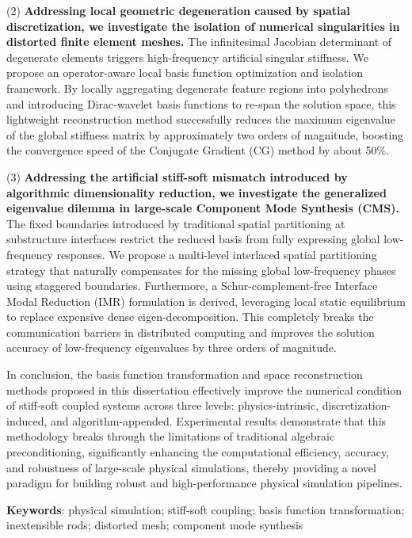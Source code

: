(2) \textbf{Addressing local geometric degeneration caused by spatial discretization, we investigate the isolation of numerical singularities in distorted finite element meshes.} The infinitesimal Jacobian determinant of degenerate elements triggers high-frequency artificial singular stiffness. We propose an operator-aware local basis function optimization and isolation framework. By locally aggregating degenerate feature regions into polyhedrons and introducing Dirac-wavelet basis functions to re-span the solution space, this lightweight reconstruction method successfully reduces the maximum eigenvalue of the global stiffness matrix by approximately two orders of magnitude, boosting the convergence speed of the Conjugate Gradient (CG) method by about 50\%.

(3) \textbf{Addressing the artificial stiff-soft mismatch introduced by algorithmic dimensionality reduction, we investigate the generalized eigenvalue dilemma in large-scale Component Mode Synthesis (CMS).} The fixed boundaries introduced by traditional spatial partitioning at substructure interfaces restrict the reduced basis from fully expressing global low-frequency responses. We propose a multi-level interlaced spatial partitioning strategy that naturally compensates for the missing global low-frequency phases using staggered boundaries. Furthermore, a Schur-complement-free Interface Modal Reduction (IMR) formulation is derived, leveraging local static equilibrium to replace expensive dense eigen-decomposition. This completely breaks the communication barriers in distributed computing and improves the solution accuracy of low-frequency eigenvalues by three orders of magnitude.

In conclusion, the basis function transformation and space reconstruction methods proposed in this dissertation effectively improve the numerical condition of stiff-soft coupled systems across three levels: physics-intrinsic, discretization-induced, and algorithm-appended. Experimental results demonstrate that this methodology breaks through the limitations of traditional algebraic preconditioning, significantly enhancing the computational efficiency, accuracy, and robustness of large-scale physical simulations, thereby providing a novel paradigm for building robust and high-performance physical simulation pipelines.

\bigskip
\noindent \textbf{Keywords}: physical simulation; stiff-soft coupling; basis function transformation; inextensible rods; distorted mesh; component mode synthesis
